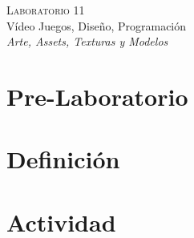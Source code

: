 \begin{center}
\textsc{\Large Laboratorio 11}~\\
{\large Vídeo Juegos, Diseño, Programación}~\\
\emph{Arte, Assets, Texturas y Modelos}
\end{center}

\section{Pre-Laboratorio}

\section{Definición}


\section{Actividad}
